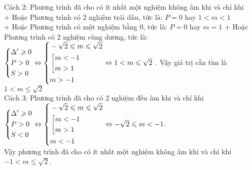 \begin{ex}
{		Cách 2:     Phương trình đã cho có ít nhất một nghiệm không âm khi và chỉ khi\\
		+ Hoặc Phương trình có 2 nghiệm trái dấu, tức là: $P = 
		0$ hay $ 1 < m < 1$\\
		+ Hoặc Phương trình có một nghiệm bằng 0, tức là: $P = 0$ hay $m = 1$
		+ Hoặc Phương trình có 2 nghiệm cùng dương, tức là: \\
		$\left\{\begin{aligned}& \Delta'\geqslant 0 \\
			& P>0 \\
			& S>0 
		\end{aligned}\right.\Leftrightarrow \left\{\begin{aligned}& -\sqrt{2}\leqslant m\leqslant \sqrt{2} \\
			& \left[\begin{aligned}& m<-1 \\
				& m>1 
			\end{aligned}\right. \\
			& m>-1 
		\end{aligned}\right.\Leftrightarrow 1<m\leqslant \sqrt{2}$ . Vậy giá trị cần tìm là $1<m\leqslant \sqrt{2}$\\
		Cách 3:   Phương trình đã cho có 2 nghiệm đều âm khi và chỉ khi\\ $\left\{\begin{aligned}& \Delta'\geqslant 0 \\
			& P>0 \\
			& S<0 
		\end{aligned}\right.\Leftrightarrow \left\{\begin{aligned}& -\sqrt{2}\leqslant m\leqslant \sqrt{2} \\
			& \left[\begin{aligned}& m<-1 \\
				& m>1 
			\end{aligned}\right. \\
			& m<-1 
		\end{aligned}\right.\Leftrightarrow -\sqrt{2}\leqslant m<-1$. \\
		Vậy phương trình đã cho có ít nhất một nghiệm không âm khi và chỉ khi $-1 < m\leqslant \sqrt{2}$.
		
	}
\end{ex}
